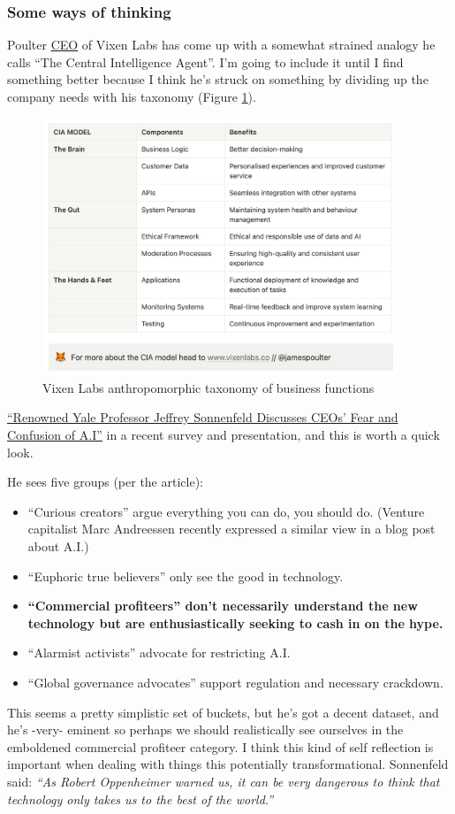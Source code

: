 \subsubsection{Some ways of thinking}
Poulter \href{https://twitter.com/jamespoulter}{CEO} of Vixen Labs has come up with a somewhat strained analogy he calls ``The Central Intelligence Agent''. I'm going to include it until I find something better because I think he's struck on something by dividing up the company needs with his taxonomy (Figure \ref{fig:vixenAnthro}).
\begin{figure}[H]
    \centering
    \includegraphics[width=0.95\textwidth]{images/vixenanthro}
    \caption{Vixen Labs anthropomorphic taxonomy of business functions}
    \label{fig:vixenAnthro}
\end{figure}
\href{https://observer.com/2023/06/ceo-ai-survey-yale-professor/}{``Renowned Yale Professor Jeffrey Sonnenfeld Discusses CEOs’ Fear and Confusion of A.I''} in a recent survey and presentation, and this is worth a quick look.\par
He sees five groups (per the article):
\begin{itemize}
\item ``Curious creators'' argue everything you can do, you should do. (Venture capitalist Marc Andreessen recently expressed a similar view in a blog post about A.I.)
\item ``Euphoric true believers'' only see the good in technology.
\item \textbf{``Commercial profiteers'' don’t necessarily understand the new technology but are enthusiastically seeking to cash in on the hype.}
\item ``Alarmist activists'' advocate for restricting A.I.
\item ``Global governance advocates'' support regulation and necessary crackdown.
\end{itemize}
This seems a pretty simplistic set of buckets, but he's got a decent dataset, and he's -very- eminent so perhaps we should realistically see ourselves in the emboldened commercial profiteer category. I think this kind of self reflection is important when dealing with things this potentially transformational. Sonnenfeld said: \textit{``As Robert Oppenheimer warned us, it can be very dangerous to think that technology only takes us to the best of the world.''}
